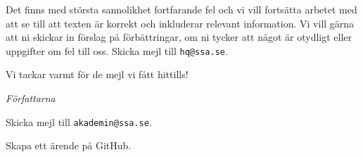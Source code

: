 Det finns med största sannolikhet fortfarande fel och vi vill fortsätta arbetet
med att se till att texten är korrekt och inkluderar relevant information.
Vi vill gärna att ni skickar in förslag på förbättringar, om ni tycker att något
är otydligt eller uppgifter om fel till oss.
Skicka mejl till \texttt{hq@ssa.se}.

\medskip

Vi tackar varmt för de mejl vi fått hittills!

\bigskip

\noindent\emph{Författarna}

\bigskip

\begin{tcolorbox}[sidebyside,colback=white,title=Två sätt att lämna återkoppling]
\begin{center}
\end{center}

Skicka mejl till \texttt{akademin@ssa.se}.
\tcblower
\begin{center}
\end{center}

Skapa ett ärende på GitHub.
\end{tcolorbox}

